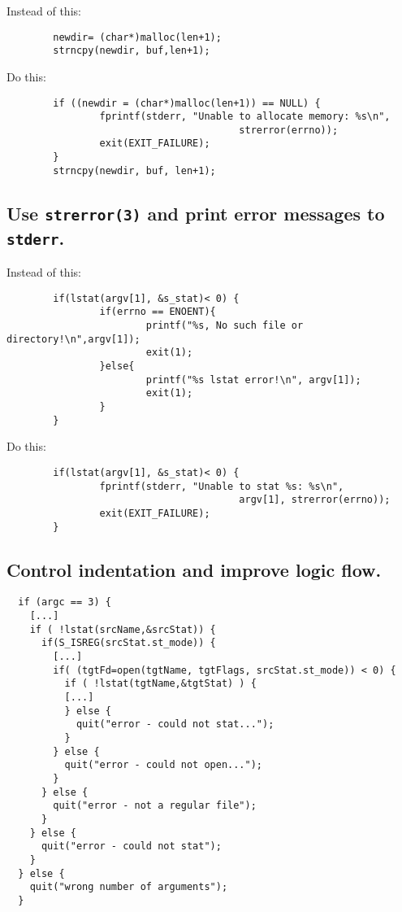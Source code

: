 \documentclass[xga]{xdvislides}
\begin{document}
Instead of this:
\begin{verbatim}
        newdir= (char*)malloc(len+1);
        strncpy(newdir, buf,len+1);
\end{verbatim}

Do this:
\begin{verbatim}
        if ((newdir = (char*)malloc(len+1)) == NULL) {
                fprintf(stderr, "Unable to allocate memory: %s\n",
                                        strerror(errno));
                exit(EXIT_FAILURE);
        }
        strncpy(newdir, buf, len+1);
\end{verbatim}

\subsection{Use {\tt strerror(3)} and print error messages to {\tt stderr}.}
Instead of this:
\begin{verbatim}
        if(lstat(argv[1], &s_stat)< 0) {
                if(errno == ENOENT){
                        printf("%s, No such file or directory!\n",argv[1]);
                        exit(1);
                }else{
                        printf("%s lstat error!\n", argv[1]);
                        exit(1);
                }
        }
\end{verbatim}
Do this:
\begin{verbatim}
        if(lstat(argv[1], &s_stat)< 0) {
                fprintf(stderr, "Unable to stat %s: %s\n",
                                        argv[1], strerror(errno));
                exit(EXIT_FAILURE);
        }
\end{verbatim}

\subsection{Control indentation and improve logic flow.}
\smallish
\begin{verbatim}
  if (argc == 3) {
    [...]
    if ( !lstat(srcName,&srcStat)) {
      if(S_ISREG(srcStat.st_mode)) {
        [...]
        if( (tgtFd=open(tgtName, tgtFlags, srcStat.st_mode)) < 0) {
          if ( !lstat(tgtName,&tgtStat) ) {
          [...]
          } else {
            quit("error - could not stat...");
          }
        } else {
          quit("error - could not open...");
        }
      } else {
        quit("error - not a regular file");
      }
    } else {
      quit("error - could not stat");
    }
  } else {
    quit("wrong number of arguments");
  }
\end{verbatim}
\end{document}
